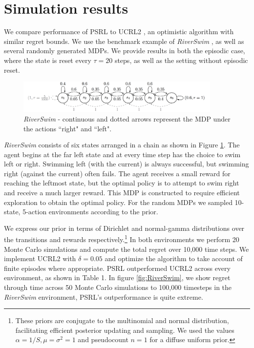 \section{Simulation results}

We compare performance of PSRL to UCRL2 \cite{jaksch2010near}, an optimistic algorithm with similar regret bounds. We use the benchmark example of \emph{RiverSwim} \cite{strehl2008analysis}, as well as several randomly generated MDPs. We provide results in both the episodic case, where the state is reset every $\tau=20$ steps, as well as the setting without episodic reset.

\begin{figure}[h!]
  \centering
    \includegraphics[width=0.9\textwidth]{Diagrams/RiverSwim}      
      \caption{\emph{RiverSwim} - continuous and dotted arrows represent the MDP under the actions ``right" and ``left".}
      \label{figure: RiverSwim}
\end{figure}

\emph{RiverSwim} consists of six states arranged in a chain as shown in Figure \ref{figure: RiverSwim}. The agent begins at the far left state and at every time step has the choice to swim left or right. Swimming left (with the current) is always successful, but swimming right (against the current) often fails. The agent receives a small reward for reaching the leftmost state, but the optimal policy is to attempt to swim right and receive a much larger reward. This MDP is constructed to require efficient exploration to obtain the optimal policy. For the random MDPs we sampled 10-state, 5-action environments according to the prior.

We express our prior in terms of Dirichlet and normal-gamma distributions over the transitions and rewards respectively.\footnote{These priors are conjugate to the multinomial and normal distribution, facilitating efficient posterior updating and sampling. We used the values $ \alpha=1/S , \mu=\sigma^2=1$ and pseudocount $n=1$ for a diffuse uniform prior.}
In both environments we perform 20 Monte Carlo simulations and compute the total regret over 10,000 time steps. We implement UCRL2 with $\delta =0.05$ and optimize the algorithm to take account of finite episodes where appropriate. PSRL outperformed UCRL2 across every environment, as shown in Table 1. In figure \ref{fig:RiverSwim}, we show regret through time across 50 Monte Carlo simulations to 100,000 timesteps in the \emph{RiverSwim} environment, PSRL's outperformance is quite extreme.


